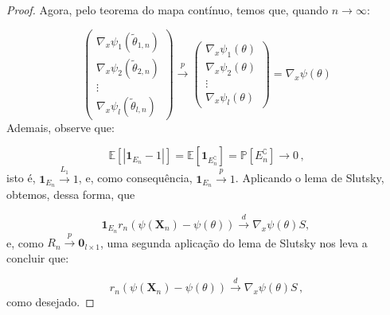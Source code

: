 \documentclass[12pt,a4paper]{article}
\begin{document}
\begin{proof}
				Agora, pelo teorema do mapa contínuo, temos que, quando $n \to\infty$:
			
			$$\begin{pmatrix}
				\nabla_x \psi_1(\tilde{\theta}_{1,n}) \\
				\nabla_x \psi_2(\tilde{\theta}_{2,n})\\
				\vdots \\
				\nabla_x \psi_l(\tilde{\theta}_{l,n})
			\end{pmatrix} \overset{p}{\to} \begin{pmatrix}
				\nabla_x \psi_1(\theta) \\
				\nabla_x \psi_2(\theta)\\
				\vdots \\
				\nabla_x \psi_l(\theta)
			\end{pmatrix} = \nabla_x \psi(\theta)$$
			Ademais, observe que:
			
			$$\mathbb{E}[|\mathbf{1}_{E_n}-1|] =\mathbb{E}[\mathbf{1}_{E_n^\complement}] =  \mathbb{P}[E^\complement_n] \to 0\, , $$
			isto é, $\mathbf{1}_{E_n} \overset{L_1}{\to}1$, e, como consequência, $\mathbf{1}_{E_n} \overset{p}{\to}1$. Aplicando o lema de Slutsky, obtemos, dessa forma, que 
		
		
			$$\mathbf{1}_{E_n}r_n(\psi(\boldsymbol{X}_n)-\psi(\theta))\overset{d}{\to} \nabla_x \psi(\theta)S,\, $$
			e, como $R_n \overset{p}{\to} \boldsymbol{0}_{l\times 1}$, uma segunda aplicação do lema de Slutsky nos leva a concluir que: 
			
			$$r_n(\psi(\boldsymbol{X}_n)-\psi(\theta))\overset{d}{\to} \nabla_x \psi(\theta)S\, ,$$
			como desejado.
	\end{proof}
\end{document}
